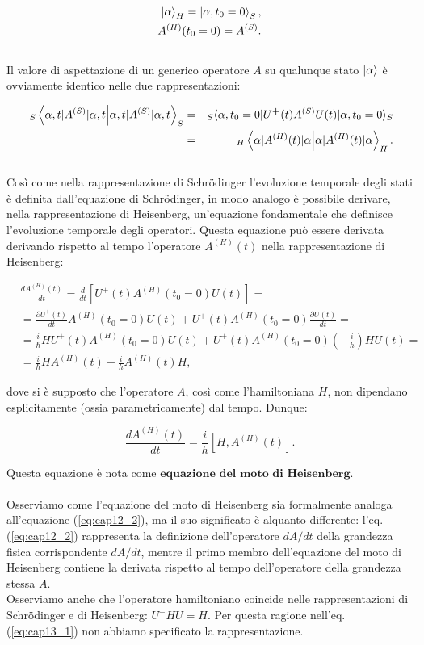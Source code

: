 \begin{align}
\ket{\alpha}_H = \ket{\alpha, t_0 = 0}_S, \\ \nonumber
A^{(H)}(t_0 = 0) = A^{(S)}.
\end{align}
\\
\noindent Il valore di aspettazione di un generico operatore $A$ su qualunque stato $\ket{\alpha}$ è ovviamente identico nelle due rappresentazioni:

\begin{eqnarray}
~_S\braket{\alpha,t|A^{(S)}|\alpha,t}_S &=& _S\langle \alpha, t_0=0\vert U^\textbf{+}(t) A^{(S)}U(t)\vert\alpha,t_0=0\rangle _S \nonumber \\
&=&~_H\braket{\alpha|A^{(H)}(t)|\alpha}_H.
\end{eqnarray}
\\
\noindent Così come nella rappresentazione di Schrödinger l'evoluzione temporale degli stati è definita dall'equazione di Schrödinger, in modo analogo è possibile derivare, nella rappresentazione di Heisenberg, un'equazione fondamentale che definisce l'evoluzione temporale degli operatori. Questa equazione può essere derivata derivando rispetto al tempo l'operatore $A^{(H)}(t)$ nella rappresentazione di Heisenberg:

\begin{align}
& \frac{dA^{(H)}(t)}{dt} = \frac{d}{dt}\left[U^\textbf{+}(t) A^{(H)}(t_0=0)U(t)\right] = \nonumber \\
&= \frac{\partial U^\textbf{+}(t)}{dt} A^{(H)}(t_0=0) U(t) + U^\textbf{+}(t) A^{(H)}(t_0=0) \frac{\partial U(t)}{dt} = \nonumber \\
&= \frac{i}{\hbar} H U^\textbf{+}(t) A^{(H)}(t_0=0) U(t) + U^\textbf{+}(t) A^{(H)}(t_0=0) \left(-\frac{i}{h}\right) H U(t) = \nonumber \\
&= \frac{i}{\hbar} H A^{(H)}(t) - \frac{i}{h} A^{(H)}(t) H,
\end{align}

\noindent dove si è supposto che l'operatore $A$, così come l'hamiltoniana $H$, non dipendano esplicitamente (ossia parametricamente) dal tempo. Dunque:

\begin{equation} \label{eq:cap13_1}
\frac{d A^{(H)}(t)}{dt} = \frac{i}{h} \left[H, A^{(H)}(t) \right].
\end{equation}

\noindent Questa equazione è nota come $\textbf{equazione del moto di Heisenberg}$.\\
\\
Osserviamo come l'equazione del moto di Heisenberg sia formalmente analoga all'equazione (\ref{eq:cap12_2}), ma il suo significato è alquanto differente: l'eq. (\ref{eq:cap12_2}) rappresenta la definizione dell'operatore $dA/dt$ della grandezza fisica corrispondente $dA/dt$, mentre il primo membro dell'equazione del moto di Heisenberg contiene la derivata rispetto al tempo dell'operatore della grandezza stessa $A$.\\
Osserviamo anche che l'operatore hamiltoniano coincide nelle rappresentazioni di Schrödinger e di Heisenberg: $U^\textbf{+} H U = H$. Per questa ragione nell'eq. (\ref{eq:cap13_1}) non abbiamo specificato la rappresentazione.
